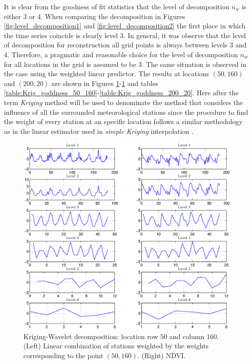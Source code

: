 \documentclass[10pt,letterpaper,conference]{ieeeconf}
\begin{document}
It is clear from the goodness of fit statistics that the level of decomposition 
$n_w$ is either $3$ or $4$. When comparing the decomposition in Figures 
\ref{fig:level_decomposition1} and \ref{fig:level_decomposition2} the first 
place in which the time series coincide is clearly level $3$. In general, it 
was observe that the level of decomposition for reconstruction all grid points 
is always between levels $3$ and $4$. Therefore, a pragmatic and 
reasonable choice for the level of decomposition $n_w$ for all locations in the 
grid is assumed to be $3$. The same situation is observed in the case using the 
weighted linear predictor. The results 
at locations $(50,160)$ and $(200,20)$ are shown in Figures 
\ref{fig:level_decomposition5}-\ref{fig:level_decomposition5} and tables 
\ref{table:Krig_goddness_50_160}-\ref{table:Krig_goddness_200_20}. 
Here after the term \emph{Kriging} method  will be used to 
denominate the method that considers the influence of all the surrounded 
meteorological stations since the procedure to find the weight of every station 
at an specific location follows a similar methodology as in the linear  
estimator used in \emph{simple Kriging} interpolation 
\cite{Cressie_91,Goovaerts_97,Matheron_65}.
\begin{figure}[ht]
\begin{center}
\includegraphics[width=\columnwidth]{point50_160Kriging}
\vspace*{-0.2in}
\caption{Kriging-Wavelet decomposition: location row $50$ and column $160$. 
(Left) Linear combination of stations weighted by the weights corresponding to 
the point $(50,160)$. (Right) NDVI.}
\label{fig:level_decomposition5}
\end{center}
\end{figure}
\end{document}
